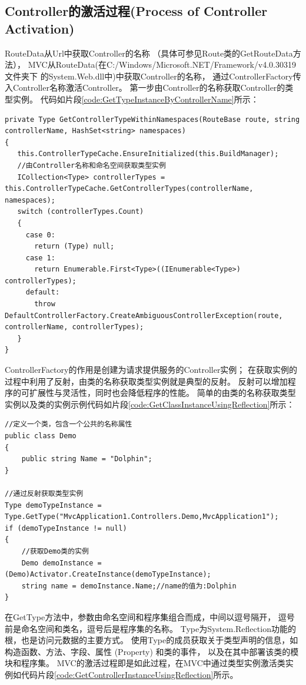 \documentclass{book}
\begin{document}
\subsection{Controller的激活过程(Process of Controller Activation)}

RouteData从Url中获取Controller的名称
（具体可参见Route类的GetRouteData方法），
MVC从RouteData(在C:/Windows/Microsoft.NET/Framework/v4.0.30319文件夹下
的System.Web.dll中)中获取Controller的名称，
通过ControllerFactory传入Controller名称激活Controller。
第一步由Controller的名称获取Controller的类型实例。
代码如片段\ref{code:GetTypeInstanceByControllerName}所示：

\begin{lstlisting}[language={[Sharp]C},caption=由Controller名称获取类型实例,label={code:GetTypeInstanceByControllerName}]
private Type GetControllerTypeWithinNamespaces(RouteBase route, string controllerName, HashSet<string> namespaces)
{
   this.ControllerTypeCache.EnsureInitialized(this.BuildManager);
   //由Controller名称和命名空间获取类型实例
   ICollection<Type> controllerTypes = this.ControllerTypeCache.GetControllerTypes(controllerName, namespaces);
   switch (controllerTypes.Count)
   {
     case 0:
       return (Type) null;
     case 1:
       return Enumerable.First<Type>((IEnumerable<Type>) controllerTypes);
     default:
       throw DefaultControllerFactory.CreateAmbiguousControllerException(route, controllerName, controllerTypes);
   }
}
\end{lstlisting}

ControllerFactory的作用是创建为请求提供服务的Controller实例；
在获取实例的过程中利用了反射，由类的名称获取类型实例就是典型的反射。
反射可以增加程序的可扩展性与灵活性，同时也会降低程序的性能。
简单的由类的名称获取类型实例以及类的实例示例代码如片段\ref{code:GetClassInstanceUsingReflection}所示：

\begin{lstlisting}[language={[Sharp]C},caption=反射获取类的实例示例,label={code:GetClassInstanceUsingReflection}]
//定义一个类，包含一个公共的名称属性
public class Demo
{
    public string Name = "Dolphin";
}

//通过反射获取类型实例
Type demoTypeInstance = Type.GetType("MvcApplication1.Controllers.Demo,MvcApplication1");
if (demoTypeInstance != null)
{
	//获取Demo类的实例
    Demo demoInstance = (Demo)Activator.CreateInstance(demoTypeInstance);
    string name = demoInstance.Name;//name的值为:Dolphin
}
\end{lstlisting}

在GetType方法中，参数由命名空间和程序集组合而成，中间以逗号隔开，
逗号前是命名空间和类名，逗号后是程序集的名称。
Type为System.Reflection功能的根，也是访问元数据的主要方式。
使用Type的成员获取关于类型声明的信息，如构造函数、方法、字段、属性 (Property) 和类的事件，
以及在其中部署该类的模块和程序集。
MVC的激活过程即是如此过程，在MVC中通过类型实例激活类实例如代码片段\ref{code:GetControllerInstanceUsingReflection}所示。
\end{document}
